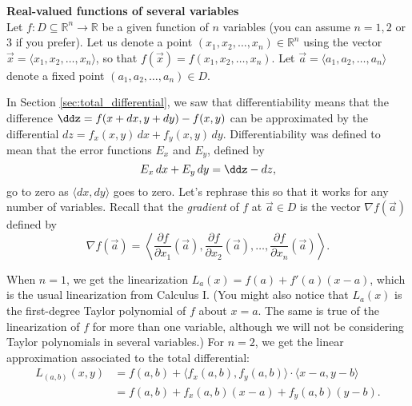 \noindent\textbf{\large Real-valued functions of several variables}\\

Let $f:D\subseteq \mathbb{R}^n\to \mathbb{R}$ be a given function of $n$ variables (you can assume $n=1, 2$ or 3 if you prefer). Let us denote a point $(x_1,x_2,\ldots, x_n)\in\mathbb{R}^n$ using the vector $\vec x = \langle x_1,x_2,\ldots, x_n\rangle$, so that $f(\vec x) = f(x_1,x_2,\ldots,x_n)$. Let $\vec a = \langle a_1,a_2,\ldots, a_n\rangle$ denote a fixed point $(a_1,a_2,\ldots, a_n)\in D$.

In Section \ref{sec:total_differential}, we saw that differentiability means that the difference $\ddz = f(x+dx,y+dy) - f(x,y)$ can be approximated by the differential $dz = f_x(x,y)\,dx+f_y(x,y)\,dy$. Differentiability was defined to mean that the error functions $E_x$ and $E_y$, defined by
\[
E_x\,dx+E_y\,dy = \ddz -dz,
\]
go to zero as $\langle dx,dy\rangle$ goes to zero. Let's rephrase this so that it works for any number of variables. Recall that the  \emph{gradient} of $f$ at $\vec{a}\in D$ is the vector $\nabla f(\vec{a})$ defined by
 \[
 \nabla f(\vec{a}) = \left< \frac{\partial f}{\partial x_1}(\vec{a}),\frac{\partial f}{\partial x_2}(\vec{a}),\ldots, \frac{\partial f}{\partial x_n}(\vec{a})\right>.
 \]

When $n=1$, we get the linearization $L_a(x) = f(a)+f'(a)(x-a)$, which is the usual linearization from Calculus I. (You might also notice that $L_a(x)$ is the first-degree Taylor polynomial of $f$ about $x=a$. The same is true of the linearization of $f$ for more than one variable, although we will not be considering Taylor polynomials in several variables.) For $n=2$, we get the linear approximation associated to the total differential:
\begin{align*}
L_{(a,b)}(x,y) &= f(a,b)+\langle f_x(a,b),f_y(a,b)\rangle\cdot \langle x-a,y-b\rangle\\
& = f(a,b) + f_x(a,b)(x-a)+f_y(a,b)(y-b).
\end{align*}


